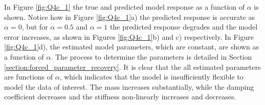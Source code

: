 \documentclass{article}
\begin{document}
In Figure \ref{fig:Q4c_1} the true and predicted model response as a function of $\alpha$ is shown. Notice how in Figure \ref{fig:Q4c_1}a) the predicted response is accurate as $\alpha = 0$, but for $\alpha = 0.5$ and $\alpha = 1$ the predicted response degrades and the model error increases, as shown in Figures \ref{fig:Q4c_1}b) and c) respectively.  In Figure \ref{fig:Q4c_1}d), the estimated model parameters, which are constant, are shown as a function of $\alpha$. The process to determine the parameters is detailed in Section \ref{section:forced_parameter_recovery}. It is clear that the all estimated parameters are functions of $\alpha$, which indicates that the model is insufficiently flexible to model the data of interest. The mass increases substantially, while the damping coefficient decreases and the stiffness non-linearly increases and decreases.  
\end{document}
